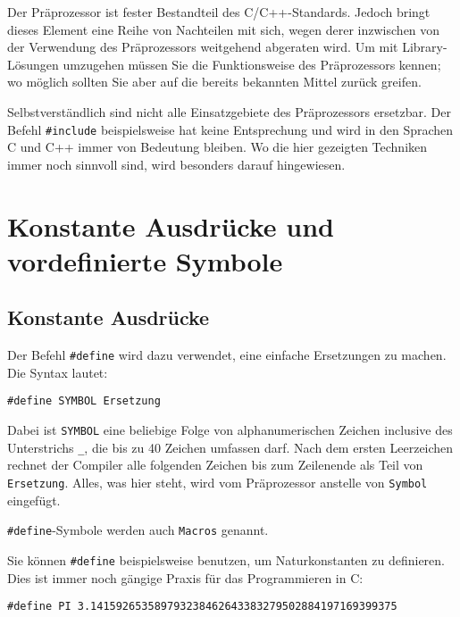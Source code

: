 \begin{warnbox}
Der Präprozessor ist fester Bestandteil des C/C++-Standards. Jedoch bringt dieses Element eine Reihe von Nachteilen mit sich, wegen derer inzwischen von der Verwendung des Präprozessors weitgehend abgeraten wird. Um mit Library-Lösungen umzugehen müssen Sie die Funktionsweise des Präprozessors kennen; wo möglich sollten Sie aber auf die bereits bekannten Mittel zurück greifen.

Selbstverständlich sind nicht alle Einsatzgebiete des Präprozessors ersetzbar. Der Befehl 
\texttt{#include} beispielsweise hat keine Entsprechung und wird in den Sprachen C und C++ immer von Bedeutung bleiben. Wo die hier gezeigten Techniken immer noch sinnvoll sind, wird besonders darauf hingewiesen.
\end{warnbox}

\section{Konstante Ausdrücke und vordefinierte Symbole}
\subsection{Konstante Ausdrücke}
Der Befehl \texttt{#define} wird dazu verwendet, eine einfache Ersetzungen zu machen. Die Syntax lautet:

\begin{codebox}
\begin{verbatim}
#define SYMBOL Ersetzung
\end{verbatim}
\end{codebox}

Dabei ist \texttt{SYMBOL} eine beliebige Folge von alphanumerischen Zeichen inclusive des Unterstrichs \texttt{\_}, die bis zu 40 Zeichen umfassen darf. Nach dem ersten Leerzeichen rechnet der Compiler alle folgenden Zeichen bis zum Zeilenende als Teil von \texttt{Ersetzung}. Alles, was hier steht, wird vom  Präprozessor anstelle von \texttt{Symbol} eingefügt.

\texttt{#define}-Symbole werden auch \texttt{Macros} genannt.

Sie können \texttt{#define} beispielsweise benutzen, um Naturkonstanten zu definieren. Dies ist immer noch gängige Praxis für das Programmieren in C:

\begin{codebox}
\begin{verbatim}
#define PI 3.141592653589793238462643383279502884197169399375
\end{verbatim}
\end{codebox}

